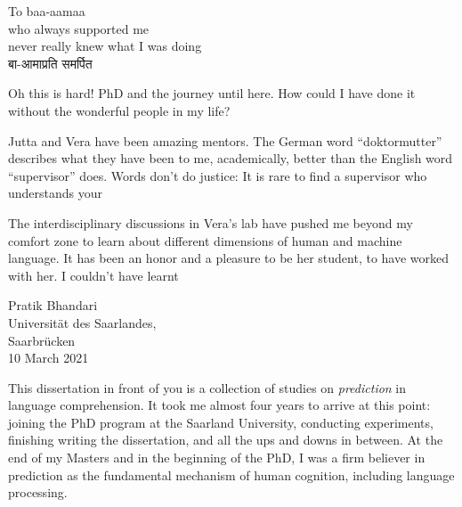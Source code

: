 \documentclass[a4paper, nobind]{templates/ociamthesis}
\begin{document}
\begin{romanpages}

\maketitle

\begin{dedication}
  To baa-aamaa\\
  who always supported me\\
  never really knew what I was doing\\
  बा-आमाप्रति समर्पित
\end{dedication}



\begin{acknowledgements}
 	Oh this is hard! PhD and the journey until here.
 How could I have done it without the wonderful people in my life?

 Jutta and Vera have been amazing mentors.
 The German word ``doktormutter'' describes what they have been to me, academically, better than the English word ``supervisor'' does.
 Words don't do justice:
 It is rare to find a supervisor who understands your

 The interdisciplinary discussions in Vera's lab have pushed me beyond my comfort zone to learn about different dimensions of human and machine language.
 It has been an honor and a pleasure to be her student, to have worked with her.
 I couldn't have learnt

 \begin{flushright}
 Pratik Bhandari \\
 Universität des Saarlandes,\\
 Saarbrücken \\
 10 March 2021
 \end{flushright}
\end{acknowledgements}





\begin{preface}
 	This dissertation in front of you is a collection of studies on \emph{prediction} in language comprehension.
 It took me almost four years to arrive at this point: joining the PhD program at the Saarland University, conducting experiments, finishing writing the dissertation, and all the ups and downs in between.
 At the end of my Masters and in the beginning of the PhD,
 I was a firm believer in prediction as the fundamental mechanism of human cognition, including language processing.


\end{preface}
\end{romanpages}
\end{document}

